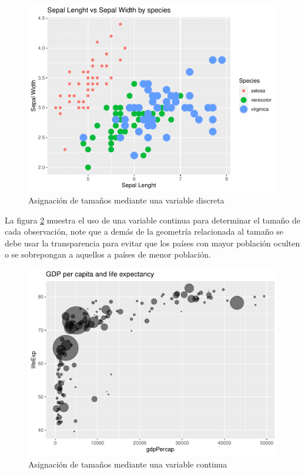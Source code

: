 \documentclass[
]{book}
\begin{document}
\begin{figure}

{\centering \includegraphics[width=0.8\linewidth]{Lineamientos-Visualizar_files/figure-latex/usotamanodiscreto-fig-1} 

}

\caption{Asignación de tamaños mediante una variable discreta}\label{fig:usotamanodiscreto-fig}
\end{figure}

La figura \ref{fig:usotamanocontinuo-fig} muestra el uso de una variable continua para determinar el tamaño de cada observación, note que a demás de la geometría relacionada al tamaño se debe usar la transparencia para evitar que los países con mayor población oculten o se sobrepongan a aquellos a países de menor población.

\begin{figure}

{\centering \includegraphics[width=0.8\linewidth]{Lineamientos-Visualizar_files/figure-latex/usotamanocontinuo-fig-1} 

}

\caption{Asignación de tamaños mediante una variable continua}\label{fig:usotamanocontinuo-fig}
\end{figure}
\end{document}
